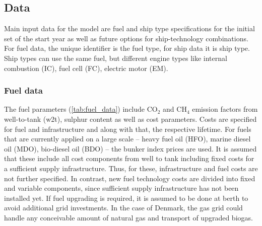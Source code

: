 \documentclass[article]{elsarticle}
\begin{document}
\subsection{Data}
\label{subsec:Dat}
Main input data for the model are fuel and ship type specifications for the initial set of the start year as well as future options for ship-technology combinations. For fuel data, the unique identifier is the fuel type, for ship data it is ship type. Ship types can use the same fuel, but different engine types like internal combustion (IC), fuel cell (FC), electric motor (EM).

\subsubsection{Fuel data}
The fuel parameters (\autoref{tab:fuel_data}) include CO$_2$ and CH$_4$ emission factors from well-to-tank (w2t), sulphur content as well as cost parameters. Costs are specified for fuel and infrastructure and along with that, the respective lifetime. For fuels that are currently applied on a large scale -- heavy fuel oil (HFO), marine diesel oil (MDO), bio-diesel oil (BDO) -- the bunker index prices are used. It is assumed that these include all cost components from well to tank including fixed costs for a sufficient supply infrastructure. Thus, for these, infrastructure and fuel costs are not further specified. In contrast, new fuel technology costs are divided into fixed and variable components, since sufficient supply infrastructure has not been installed yet. If fuel upgrading is required, it is assumed to be done at berth to avoid additional grid investments. In the case of Denmark, the gas grid could handle any conceivable amount of natural gas and transport of upgraded biogas.
\end{document}
